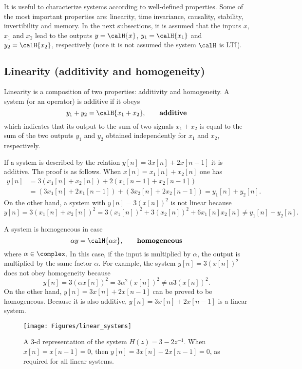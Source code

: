 
It is useful to characterize systems according to well-defined properties. Some of the most important properties are: linearity, time invariance, causality, stability, invertibility and memory.
In the next subsections, it is assumed that the inputs $x$, $x_1$ and $x_2$ lead to the outputs $y=\calH\{x\}$, $y_1=\calH\{x_1\}$ and $y_2=\calH\{x_2\}$, respectively (note it is not assumed the system $\calH$ is LTI). 

\subsection{Linearity (additivity and homogeneity)}
\label{app:linearity}

Linearity is a composition of two properties: additivity and homogeneity. A system (or an operator) is additive if it obeys
\[
y_1 + y_2 = \calH\{x_1 + x_2\},\tag*{\textbf{additive}}
\]
which indicates that its output to the sum of two signals $x_1 + x_2$ is equal to the sum of the two outputs $y_1$ and $y_2$ obtained independently for $x_1$ and $x_2$, respectively.

If a system is described by the relation $y[n]=3x[n] + 2x[n-1]$ it is additive. The proof is as follows. When $x[n]=x_1[n] + x_2[n]$ one has
\begin{align*}
y[n] &= 3(x_1[n] + x_2[n]) + 2(x_1[n-1] + x_2[n-1])\\
&= (3x_1[n] + 2x_1[n-1]) + (3x_2[n] + 2x_2[n-1]) = y_1[n]+y_2[n].
\end{align*}
On the other hand, a system with $y[n]=3(x[n])^2$ is not linear because
\[
y[n] = 3(x_1[n] + x_2[n])^2 = 3(x_1[n])^2 + 3(x_2[n])^2 + 6x_1[n]x_2[n] \ne y_1[n]+y_2[n].
\]


A system is homogeneous in case
\[
\alpha y = \calH\{ \alpha x \},\tag*{\textbf{homogeneous}}
\]
where $\alpha \in \complex$. In this case, if the input is multiplied by $\alpha$, the output is multiplied by the same factor $\alpha$. For example, the system $y[n]=3(x[n])^2$ does not obey homogeneity because 
\[
y[n]=3(\alpha x[n])^2 = 3 \alpha^2 (x[n])^2 \ne \alpha 3  (x[n])^2.
\]
On the other hand, $y[n]=3x[n] + 2x[n-1]$ can be proved to be homogeneous. Because it is also additive, $y[n]=3x[n] + 2x[n-1]$ is a linear system.

\begin{figure}
\centering
\texttt{[image: Figures/linear\_systems]}
\caption[{A 3-d representation of the system $H(z)=3 - 2z^{-1}$.}]{A 3-d representation of the system $H(z)=3 - 2z^{-1}$. When $x[n]=x[n-1]=0$, then $y[n]=3x[n]-2x[n-1]=0$, as required for all linear systems. \label{fig:linear_systems}}
\end{figure}

